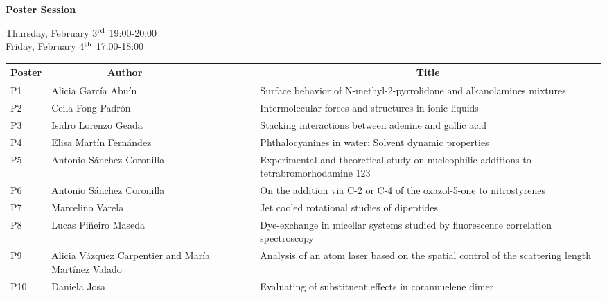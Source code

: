 \vspace{10.0cm}

{\large \bf Poster Session}

\vspace{0.5cm}

\noindent
   Thursday, February 3$^{\rm rd}$ 19:00-20:00\\ 
   Friday, February 4$^{\rm th}$ 17:00-18:00
\begin{center}
\begin{tabular}{|m{1.2cm}|m{5.0cm}|m{10.0cm}|}
\hline 
 \cellcolor[gray]{0.7} {\bf Poster} &  \cellcolor[gray]{0.7} {\bf ~~~~~~~~~~Author} & \cellcolor[gray]{0.7}  {\bf ~~~~~~~~~~~~~~~~~~~~~~~~~~~~Title} \\
\hline
P1 & Alicia Garc\'ia Abu\'in & Surface behavior of N-methyl-2-pyrrolidone and alkanolamines  mixtures \\ 
\hline
P2 & Ceila Fong Padr\'on & Intermolecular forces and structures in ionic liquids \\ 
\hline
P3 & Isidro Lorenzo Geada & Stacking interactions between adenine and gallic acid \\ 
\hline
P4 & Elisa Mart\'in Fern\'andez & Phthalocyanines in water: Solvent dynamic properties \\ 
\hline
P5 & Antonio S\'anchez Coronilla & Experimental and theoretical study on nucleophilic additions to tetrabromorhodamine 123 \\ 
\hline
P6 & Antonio S\'anchez Coronilla & On the addition via C-2 or C-4 of the oxazol-5-one to nitrostyrenes \\ 
\hline
P7 & Marcelino Varela & Jet cooled rotational studies of dipeptides \\ 
\hline
P8 & Lucas Pi\~neiro Maseda & Dye-exchange in micellar systems studied by fluorescence correlation spectroscopy \\ 
\hline
P9 & Alicia V\'azquez Carpentier and María Mart\'inez Valado & Analysis of an atom laser based on the spatial control of the scattering length \\ 
\hline
P10 & Daniela Josa & Evaluating of substituent effects in corannuelene dimer \\ 
\hline
\end{tabular}
\end{center}
